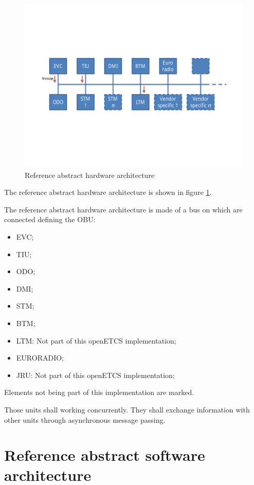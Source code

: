 \documentclass{template/openetcs_report}
\begin{document}
\begin{figure}
  \centering
  \includegraphics[width=\linewidth]{abstract-hardware-architecture.pdf}
  \caption{Reference abstract hardware architecture}
  \label{fig:hardware-arch}
\end{figure}

The reference abstract hardware architecture is shown in figure
\ref{fig:hardware-arch}.

The reference abstract hardware architecture is made of a bus on which
are connected  defining the \gls{OBU}:

\begin{itemize}
\item \gls{EVC};
\item \gls{TIU};
\item \gls{ODO};
\item \gls{DMI};
\item \gls{STM};
\item \gls{BTM};
\item \gls{LTM}: Not part of this openETCS implementation;
\item EURORADIO;
\item \gls{JRU}: Not part of this openETCS implementation;
\end{itemize}

Elements not being part of this implementation are marked. 

Those units shall working concurrently. They shall exchange
information with other units through asynchronous message passing.

\section{Reference abstract software architecture}
\label{software-arch}
\end{document}
